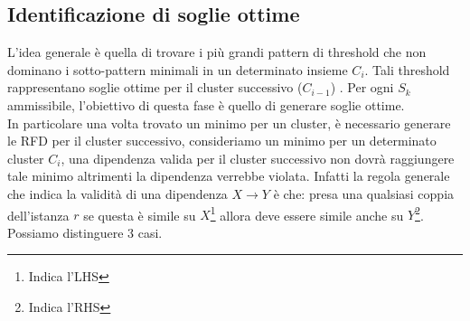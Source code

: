 \subsection{Identificazione di soglie ottime}
L'idea generale è quella di trovare i più grandi pattern di threshold che non dominano i sotto-pattern minimali in un determinato insieme $C_{i}$. Tali threshold rappresentano soglie ottime per il cluster successivo ($C_{i-1}$) . Per ogni $S_{k}$ ammissibile, l'obiettivo di questa fase è quello di generare soglie ottime.\\
In particolare una volta trovato un minimo per un cluster, è necessario generare le RFD per il cluster successivo, consideriamo un minimo per un determinato cluster $C_{i}$, una dipendenza valida per il cluster successivo non dovrà raggiungere tale minimo altrimenti la dipendenza verrebbe violata. Infatti la regola generale che indica la validità di una dipendenza $X \rightarrow Y$ è che: presa una qualsiasi coppia dell'istanza $r$ se questa è simile su $X$\footnote{Indica l'LHS} allora deve essere simile anche su $Y$\footnote{Indica l'RHS}. Possiamo distinguere 3 casi.
